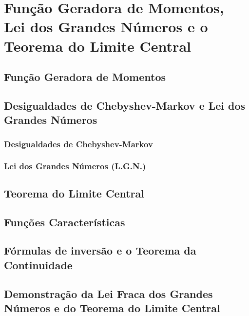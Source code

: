 \documentclass[../Notas.tex]{subfiles}
\begin{document}
\section{Função Geradora de Momentos, Lei dos Grandes Números e o Teorema do Limite Central}

\subsection{Função Geradora de Momentos}

\subsection{Desigualdades de Chebyshev-Markov e Lei dos Grandes Números}

\subsubsection{Desigualdades de Chebyshev-Markov}

\subsubsection{Lei dos Grandes Números (L.G.N.)}

\subsection{Teorema do Limite Central}

\subsection{Funções Características}

\subsection{Fórmulas de inversão e o Teorema da Continuidade}

\subsection{Demonstração da Lei Fraca dos Grandes Números e do Teorema do Limite Central}
\end{document}
